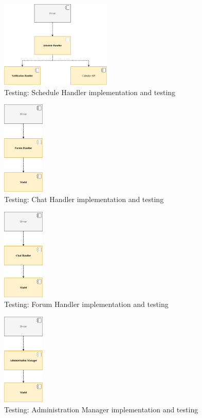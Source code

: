 \documentclass[10pt]{report}
\begin{document}
\begin{figure}[H]
    \centering
    \includegraphics[width=200px]{Testing/T_05.jpg}
    \caption{Testing: Schedule Handler implementation and testing}
\end{figure}

\begin{figure}[H]
    \centering
    \includegraphics[width=75px]{Testing/T_06.jpg}
    \caption{Testing: Chat Handler implementation and testing}
\end{figure}

\begin{figure}[H]
    \centering
    \includegraphics[width=75px]{Testing/T_07.jpg}
    \caption{Testing: Forum Handler implementation and testing}
\end{figure}

\begin{figure}[H]
    \centering
    \includegraphics[width=75px]{Testing/T_08.jpg}
    \caption{Testing: Administration Manager implementation and testing}
\end{figure}
\end{document}
